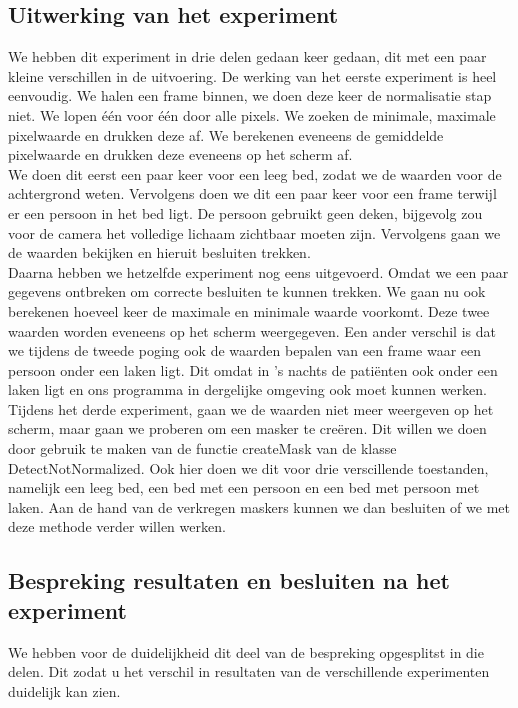 \subsection{Uitwerking van het experiment}
 \label{ERefPZNV}
 We hebben dit experiment in drie delen gedaan keer gedaan, dit met een paar kleine verschillen in de uitvoering.
 De werking van het eerste experiment is heel eenvoudig. We halen een frame binnen, we doen deze keer de normalisatie stap niet. We lopen \'e\'en voor \'e\'en door alle pixels. We zoeken de minimale, maximale pixelwaarde en drukken deze af. We berekenen eveneens de gemiddelde pixelwaarde en drukken deze eveneens op het scherm af. \\
 We doen dit eerst een paar keer voor een leeg bed, zodat we de waarden voor de achtergrond weten. Vervolgens doen we dit een paar keer voor een frame terwijl er een persoon in het bed ligt. De persoon gebruikt geen deken, bijgevolg zou voor de camera het volledige lichaam zichtbaar moeten zijn.  Vervolgens gaan we de waarden bekijken en hieruit besluiten trekken. \\
 Daarna hebben we hetzelfde experiment nog eens uitgevoerd. Omdat we een paar gegevens ontbreken om correcte besluiten te kunnen trekken. We gaan nu ook berekenen hoeveel keer de maximale en minimale waarde voorkomt. Deze twee waarden worden eveneens op het scherm weergegeven. Een ander verschil is dat we tijdens de tweede poging ook de waarden bepalen van een frame waar een persoon onder een laken ligt. Dit omdat in 's nachts de pati\"enten ook onder een laken ligt en ons programma in dergelijke omgeving ook moet kunnen werken. \\
 Tijdens het derde experiment, gaan we de waarden niet meer weergeven op het scherm, maar gaan we proberen om een masker te cre\"eren. Dit willen we doen door gebruik te maken van de functie createMask van de klasse DetectNotNormalized. Ook hier doen we dit voor drie verscillende toestanden, namelijk een leeg bed, een bed met een persoon en een bed met persoon met laken. Aan de hand van de verkregen maskers kunnen we dan besluiten of we met deze methode verder willen werken.
 
 
 \subsection{Bespreking resultaten en besluiten na het experiment}
 \label{ERefPZNB}
 We hebben voor de duidelijkheid dit deel van de bespreking opgesplitst in die delen. Dit zodat u het verschil in resultaten van de verschillende experimenten duidelijk kan zien. 
 

